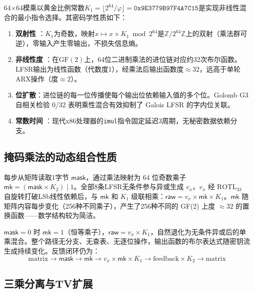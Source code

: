 \documentclass[11pt,a4paper]{ctexart}
\begin{document}
64$\times$64模乘以黄金比例常数$K_1 = \lfloor 2^{64}/\varphi \rfloor = \mathtt{0x9E3779B97F4A7C15}$是实现非线性混合的最小指令选择。其密码学性质如下：

\begin{enumerate}
\item \textbf{双射性} \cite{knuth}：$K_1$为奇数，映射$x \mapsto x \times K_1 \bmod 2^{64}$是$\mathbb{Z}/2^{64}\mathbb{Z}$上的双射（乘法群可逆），零输入产生零输出，不损失信息熵。
\item \textbf{非线性度} \cite{lidl}：在$\mathrm{GF}(2)$上，64位二进制乘法的进位链对应约32次布尔函数。LFSR输出为线性函数（代数度1），经乘法后输出函数度$\approx 32$，远高于单轮ARX操作（度$\approx 2$）。
\item \textbf{位扩散}：进位链的每一位传播使每个输出位依赖输入值的多个位。Golomb G3自相关检验 0/32 \cite{golomb} 表明乘性混合有效抑制了 Galois LFSR 的字内位关联。
\item \textbf{常数时间} \cite{chacha}：现代x86处理器的\texttt{imul}指令固定延迟3周期，无秘密数据依赖分支。
\end{enumerate}

\subsection{掩码乘法的动态组合性质}

每步从矩阵读取1字节 $\mathsf{mask}$，通过乘法映射为 64 位奇数乘子 $\mathsf{mk} = (\mathsf{mask} \times K_2) \mid 1$。全部8条LFSR无条件参与异或生成 $v_x$，$v_x$ 经 $\mathrm{ROTL}_{33}$ 自旋转打破LSb线性依赖后，与 $\mathsf{mk}$ 和 $K_1$ 级联相乘：$\mathsf{raw} = v_x \times \mathsf{mk} \times K_1$。$\mathsf{mk}$ 随矩阵内容每步变化（256种不同乘子），产生了256种不同的 GF(2) 上度 $\approx 32$ 的置换函数——数学结构较为简洁。

$\mathsf{mask}=0$ 时 $\mathsf{mk}=1$（恒等乘子），$\mathsf{raw} = v_x \times K_1$，自然退化为无条件异或后的单乘混合。整个路径无分支、无查表、无逐位操作，输出函数的布尔表达式随密钥流生成持续变化。反馈闭环仍为：
\begin{equation}
\mathrm{matrix} \rightarrow \mathsf{mask} \rightarrow \mathsf{mk} \rightarrow v_x \times \mathsf{mk} \times K_1 \rightarrow \mathrm{feedback} \times K_2 \rightarrow \mathrm{matrix}
\end{equation}

\subsection{三乘分离与TV扩展}
\end{document}
